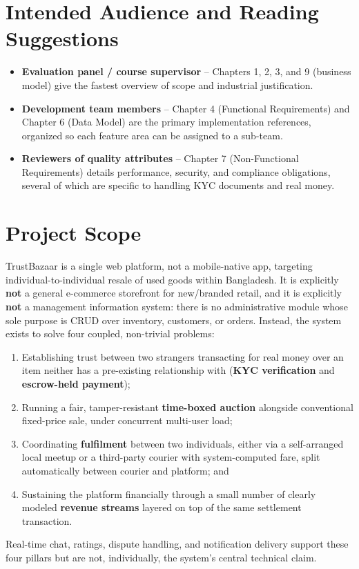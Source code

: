 \documentclass[11pt,a4paper]{report}
\begin{document}
\section{Intended Audience and Reading Suggestions}
\begin{itemize}[nosep]
    \item \textbf{Evaluation panel / course supervisor} -- Chapters 1, 2, 3, and 9 (business model) give the fastest overview of scope and industrial justification.
    \item \textbf{Development team members} -- Chapter 4 (Functional Requirements) and Chapter 6 (Data Model) are the primary implementation references, organized so each feature area can be assigned to a sub-team.
    \item \textbf{Reviewers of quality attributes} -- Chapter 7 (Non-Functional Requirements) details performance, security, and compliance obligations, several of which are specific to handling KYC documents and real money.
\end{itemize}

\section{Project Scope}
TrustBazaar is a single web platform, not a mobile-native app, targeting individual-to-individual resale of used goods within Bangladesh. It is explicitly \textbf{not} a general e-commerce storefront for new/branded retail, and it is explicitly \textbf{not} a management information system: there is no administrative module whose sole purpose is CRUD over inventory, customers, or orders. Instead, the system exists to solve four coupled, non-trivial problems:
\begin{enumerate}[nosep]
    \item Establishing trust between two strangers transacting for real money over an item neither has a pre-existing relationship with (\textbf{KYC verification} and \textbf{escrow-held payment});
    \item Running a fair, tamper-resistant \textbf{time-boxed auction} alongside conventional fixed-price sale, under concurrent multi-user load;
    \item Coordinating \textbf{fulfilment} between two individuals, either via a self-arranged local meetup or a third-party courier with system-computed fare, split automatically between courier and platform; and
    \item Sustaining the platform financially through a small number of clearly modeled \textbf{revenue streams} layered on top of the same settlement transaction.
\end{enumerate}
Real-time chat, ratings, dispute handling, and notification delivery support these four pillars but are not, individually, the system's central technical claim.
\end{document}
